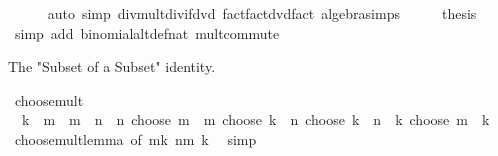 \begin{isabellebody}
\ \ \ \ \isamarkupfalse%
\ {\isacharparenleft}{\kern0pt}auto\ simp{\isacharcolon}{\kern0pt}\ div{\isacharunderscore}{\kern0pt}mult{\isacharunderscore}{\kern0pt}div{\isacharunderscore}{\kern0pt}if{\isacharunderscore}{\kern0pt}dvd\ fact{\isacharunderscore}{\kern0pt}fact{\isacharunderscore}{\kern0pt}dvd{\isacharunderscore}{\kern0pt}fact\ algebra{\isacharunderscore}{\kern0pt}simps{\isacharparenright}{\kern0pt}\isanewline
\ \ \isamarkupfalse%
\ \isamarkupfalse%
\ {\isacharquery}{\kern0pt}thesis\isanewline
\ \ \ \ \isamarkupfalse%
\ {\isacharparenleft}{\kern0pt}simp\ add{\isacharcolon}{\kern0pt}\ binomial{\isacharunderscore}{\kern0pt}altdef{\isacharunderscore}{\kern0pt}nat\ mult{\isachardot}{\kern0pt}commute{\isacharparenright}{\kern0pt}\isanewline
{}\isamarkupfalse%
%
\endisatagproof
{\isafoldproof}%
%
\isadelimproof
%
\endisadelimproof
%
\begin{isamarkuptext}%
The "Subset of a Subset" identity.%
\end{isamarkuptext}\isamarkuptrue%
\isamarkupfalse%
\ choose{\isacharunderscore}{\kern0pt}mult{\isacharcolon}{\kern0pt}\isanewline
\ \ {\isachardoublequoteopen}k\ {\isasymle}\ m\ {\isasymLongrightarrow}\ m\ {\isasymle}\ n\ {\isasymLongrightarrow}\ {\isacharparenleft}{\kern0pt}n\ choose\ m{\isacharparenright}{\kern0pt}\ {\isacharasterisk}{\kern0pt}\ {\isacharparenleft}{\kern0pt}m\ choose\ k{\isacharparenright}{\kern0pt}\ {\isacharequal}{\kern0pt}\ {\isacharparenleft}{\kern0pt}n\ choose\ k{\isacharparenright}{\kern0pt}\ {\isacharasterisk}{\kern0pt}\ {\isacharparenleft}{\kern0pt}{\isacharparenleft}{\kern0pt}n\ {\isacharminus}{\kern0pt}\ k{\isacharparenright}{\kern0pt}\ choose\ {\isacharparenleft}{\kern0pt}m\ {\isacharminus}{\kern0pt}\ k{\isacharparenright}{\kern0pt}{\isacharparenright}{\kern0pt}{\isachardoublequoteclose}\isanewline
%
\isadelimproof
\ \ %
\endisadelimproof
%
\isatagproof
{}\isamarkupfalse%
\ choose{\isacharunderscore}{\kern0pt}mult{\isacharunderscore}{\kern0pt}lemma\ {\isacharbrackleft}{\kern0pt}of\ {\isachardoublequoteopen}m{\isacharminus}{\kern0pt}k{\isachardoublequoteclose}\ {\isachardoublequoteopen}n{\isacharminus}{\kern0pt}m{\isachardoublequoteclose}\ k{\isacharbrackright}{\kern0pt}\ \isamarkupfalse%
\ simp%
\endisatagproof
{\isafoldproof}%
%
\isadelimproof
%
\endisadelimproof
%
\isadelimdocument
%
\endisadelimdocument
%
\isatagdocument
%
\isamarkuptrue%
%
\endisatagdocument
{\isafolddocument}%

\end{isabellebody}
